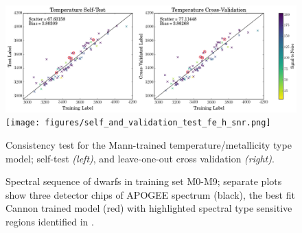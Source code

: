 \documentclass[modern]{aastex62}
\begin{document}
\begin{figure}[ht]
\begin{center}
\includegraphics[width=18cm]{figures/self_and_validation_test_teff_snr.png}
\texttt{[image: figures/self\_and\_validation\_test\_fe\_h\_snr.png]}
\end{center}
\caption{Consistency test for the Mann-trained temperature/metallicity type model; self-test \textit{(left)}, and leave-one-out cross validation \textit{(right)}.} \label{fig:mann_validation}
\end{figure}

\begin{figure}[ht]
\caption{ Spectral sequence of dwarfs in training set M0-M9; separate plots show three detector chips of APOGEE spectrum (black), the best fit Cannon trained model (red) with highlighted spectral type sensitive regions identified in \citealt{Desphande:2013}.} \label{fig:sp_sequence}
\end{figure}
\end{document}
